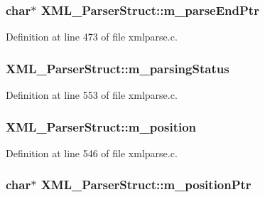\subsubsection[{\texorpdfstring{m\+\_\+parse\+End\+Ptr}{m_parseEndPtr}}]{ char$\ast$ X\+M\+L\+\_\+\+Parser\+Struct\+::m\+\_\+parse\+End\+Ptr}\hypertarget{struct_x_m_l___parser_struct_ad7ab968bbbba1f8551e3cbcee6839646}{}\label{struct_x_m_l___parser_struct_ad7ab968bbbba1f8551e3cbcee6839646}


Definition at line 473 of file xmlparse.\+c.

\subsubsection[{\texorpdfstring{m\+\_\+parsing\+Status}{m_parsingStatus}}]{ X\+M\+L\+\_\+\+Parser\+Struct\+::m\+\_\+parsing\+Status}\hypertarget{struct_x_m_l___parser_struct_acc225e1f8ac07b1665c2a052f8c3b8e2}{}\label{struct_x_m_l___parser_struct_acc225e1f8ac07b1665c2a052f8c3b8e2}


Definition at line 553 of file xmlparse.\+c.

\subsubsection[{\texorpdfstring{m\+\_\+position}{m_position}}]{ X\+M\+L\+\_\+\+Parser\+Struct\+::m\+\_\+position}\hypertarget{struct_x_m_l___parser_struct_a8cdbfa14906bcd0a810324ccee20cea0}{}\label{struct_x_m_l___parser_struct_a8cdbfa14906bcd0a810324ccee20cea0}


Definition at line 546 of file xmlparse.\+c.

\subsubsection[{\texorpdfstring{m\+\_\+position\+Ptr}{m_positionPtr}}]{ char$\ast$ X\+M\+L\+\_\+\+Parser\+Struct\+::m\+\_\+position\+Ptr}\hypertarget{struct_x_m_l___parser_struct_adbdca8607edf1f9fce1b20c4d1f812ff}{}\label{struct_x_m_l___parser_struct_adbdca8607edf1f9fce1b20c4d1f812ff}


